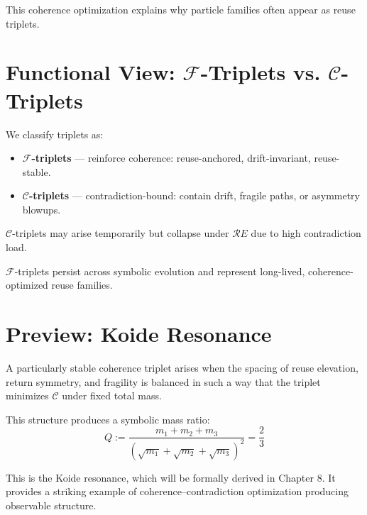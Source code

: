 This coherence optimization explains why particle families often appear as reuse triplets.

\section{Functional View: $\mathcal{F}$-Triplets vs. $\mathcal{C}$-Triplets} \label{sec:triplet-functional-classes}

We classify triplets as:

\begin{itemize}
    \item \textbf{$\mathcal{F}$-triplets} — reinforce coherence: reuse-anchored, drift-invariant, reuse-stable.
    \item \textbf{$\mathcal{C}$-triplets} — contradiction-bound: contain drift, fragile paths, or asymmetry blowups.
\end{itemize}

$\mathcal{C}$-triplets may arise temporarily but collapse under $\mathcal{R}E$ due to high contradiction load.

$\mathcal{F}$-triplets persist across symbolic evolution and represent long-lived, coherence-optimized reuse families.

\section{Preview: Koide Resonance} \label{sec:triplet-koide-preview}

A particularly stable coherence triplet arises when the spacing of reuse elevation, return symmetry, and fragility is balanced in such a way that the triplet minimizes $\mathcal{C}$ under fixed total mass.

This structure produces a symbolic mass ratio:
\[
Q := \frac{m_1 + m_2 + m_3}{\left(\sqrt{m_1} + \sqrt{m_2} + \sqrt{m_3}\right)^2} = \frac{2}{3}
\]

This is the Koide resonance, which will be formally derived in Chapter 8. It provides a striking example of coherence–contradiction optimization producing observable structure.

